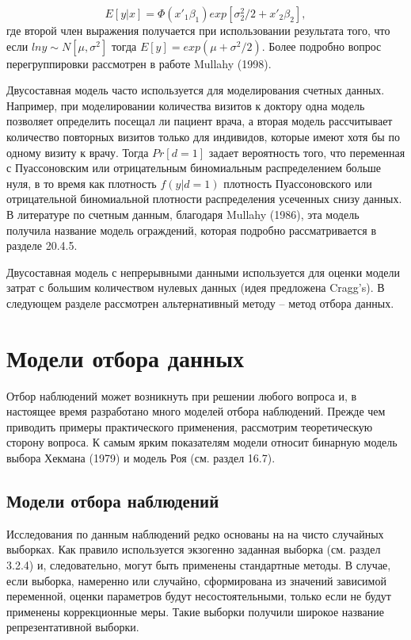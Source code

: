 \begin{equation}
E[y|x]=\Phi(x'_1\beta_1)exp[\sigma^{2}_2/2+x'_2\beta_2],
\end{equation}
где второй член выражения получается при использовании результата того, что если $ln{y}{\sim}N[\mu,\sigma^2]$ тогда $E[y]=exp(\mu+\sigma^{2}/2)$. Более подробно вопрос перегруппировки рассмотрен в работе Mullahy (1998).

Двусоставная модель часто используется для моделирования счетных данных. Например, при моделировании количества визитов к доктору одна модель позволяет определить посещал ли пациент врача, а вторая модель рассчитывает количество повторных визитов только для индивидов, которые имеют хотя бы по одному визиту к врачу. Тогда $Pr[d=1]$ задает вероятность того, что переменная с Пуассоновским или отрицательным биномиальным распределением больше нуля, в то время как плотность $f(y|d=1)$ плотность Пуассоновского или отрицательной биномиальной плотности распределения усеченных снизу данных. В литературе по счетным данным, благодаря Mullahy (1986), эта модель получила название модель ограждений, которая подробно рассматривается в разделе 20.4.5. 

Двусоставная модель с непрерывными данными используется для оценки модели затрат с большим количеством нулевых данных (идея предложена Cragg’s). В следующем разделе рассмотрен альтернативный методу – метод отбора данных.


\section{Модели отбора данных}


Отбор наблюдений может возникнуть при решении любого вопроса и, в настоящее время разработано много моделей отбора наблюдений. Прежде чем приводить примеры практического применения, рассмотрим теоретическую сторону вопроса. К самым ярким показателям модели относит  бинарную модель выбора Хекмана (1979) и модель Роя (см. раздел 16.7).


\subsection{Модели отбора наблюдений}


Исследования по данным наблюдений редко основаны на на чисто случайных выборках. Как правило используется экзогенно заданная выборка (см. раздел 3.2.4) и, следовательно, могут быть применены стандартные методы. В случае, если выборка, намеренно или случайно, сформирована из значений зависимой переменной, оценки параметров будут несостоятельными, только если не будут применены коррекционные меры. Такие выборки получили широкое название репрезентативной выборки.

